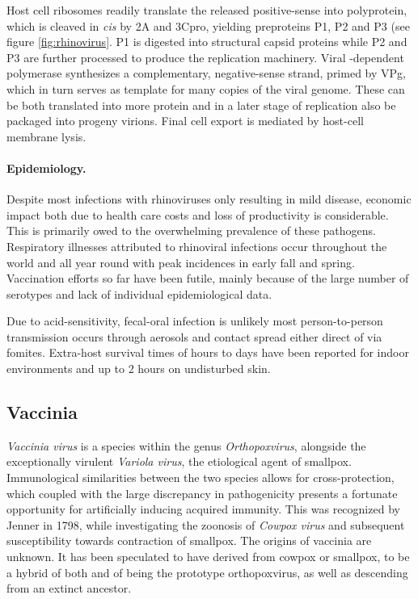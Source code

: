 Host cell ribosomes readily translate the released positive-sense  into polyprotein, which is cleaved in \textit{cis} by 2A and 3Cpro, yielding preproteins P1, P2 and P3 (see figure \ref{fig:rhinovirus}. P1 is digested into structural capsid proteins while P2 and P3 are further processed to produce the replication machinery. Viral -dependent  polymerase synthesizes a complementary, negative-sense  strand, primed by VPg, which in turn serves as template for many copies of the viral genome. These can be both translated into more protein and in a later stage of replication also be packaged into progeny virions. Final cell export is mediated by host-cell membrane lysis.

\paragraph{Epidemiology.}
Despite most infections with rhinoviruses only resulting in mild disease, economic impact both due to health care costs and loss of productivity is considerable. This is primarily owed to the overwhelming prevalence of these pathogens. Respiratory illnesses attributed to rhinoviral infections occur throughout the world and all year round with peak incidences in early fall and spring. Vaccination efforts so far have been futile, mainly because of the large number of serotypes and lack of individual epidemiological data.

Due to acid-sensitivity, fecal-oral infection is unlikely most person-to-person transmission occurs through aerosols and contact spread either direct of via fomites. Extra-host survival times of hours to days have been reported for indoor environments and up to 2 hours on undisturbed skin.

\subsection{Vaccinia}
\textit{Vaccinia virus} is a species within the genus \textit{Orthopoxvirus}, alongside the exceptionally virulent \textit{Variola virus}, the etiological agent of smallpox. Immunological similarities between the two species allows for cross-protection, which coupled with the large discrepancy in pathogenicity presents a fortunate opportunity for artificially inducing acquired immunity. This was recognized by Jenner in 1798, while investigating the zoonosis of \textit{Cowpox virus} and subsequent susceptibility towards contraction of smallpox. The origins of vaccinia are unknown. It has been speculated to have derived from cowpox or smallpox, to be a hybrid of both and of being the prototype orthopoxvirus, as well as descending from an extinct ancestor.

